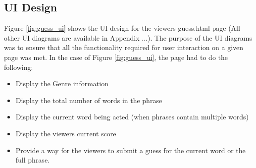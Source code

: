 \subsection{UI Design}
\begin{figure}[h!]
\end{figure}

Figure \ref{fig:guess_ui} shows the UI design for the viewers guess.html page (All other UI diagrams are available in Appendix ...). The purpose of the UI diagrams was to ensure that all the functionality required for user interaction on a given page was met. In the case of Figure \ref{fig:guess_ui}, the page had to do the following:
\begin{itemize}
	\item Display the Genre information
	
	\item Display the total number of words in the phrase
	
	\item Display the current word being acted (when phrases contain multiple words)
	
	\item Display the viewers current score
	
	\item Provide a way for the viewers to submit a guess for the current word or the full phrase.
\end{itemize}


